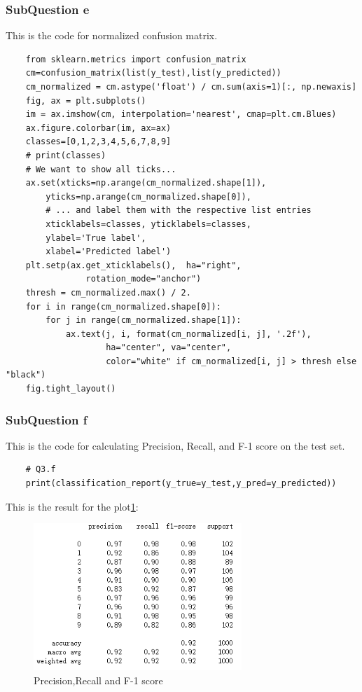 \documentclass[conference]{IEEEtran}
\begin{document}
\subsubsection{SubQuestion e}
This is the code for normalized confusion matrix.
\begin{lstlisting}
    from sklearn.metrics import confusion_matrix
    cm=confusion_matrix(list(y_test),list(y_predicted))
    cm_normalized = cm.astype('float') / cm.sum(axis=1)[:, np.newaxis]
    fig, ax = plt.subplots()
    im = ax.imshow(cm, interpolation='nearest', cmap=plt.cm.Blues)
    ax.figure.colorbar(im, ax=ax)
    classes=[0,1,2,3,4,5,6,7,8,9]
    # print(classes)
    # We want to show all ticks...
    ax.set(xticks=np.arange(cm_normalized.shape[1]),
        yticks=np.arange(cm_normalized.shape[0]),
        # ... and label them with the respective list entries
        xticklabels=classes, yticklabels=classes,
        ylabel='True label',
        xlabel='Predicted label')
    plt.setp(ax.get_xticklabels(),  ha="right",
                rotation_mode="anchor")
    thresh = cm_normalized.max() / 2.
    for i in range(cm_normalized.shape[0]):
        for j in range(cm_normalized.shape[1]):
            ax.text(j, i, format(cm_normalized[i, j], '.2f'),
                    ha="center", va="center",
                    color="white" if cm_normalized[i, j] > thresh else "black")
    fig.tight_layout()
\end{lstlisting}
\subsubsection{SubQuestion f}
This is the code for calculating Precision, Recall, and F-1 score on the test set.
\begin{lstlisting}
    # Q3.f
    print(classification_report(y_true=y_test,y_pred=y_predicted))
\end{lstlisting}
This is the result for the plot\ref{Fig.t1q3f}:
\begin{figure}[H] 
    \centering %
    \includegraphics[width=0.7\textwidth]{T1Q3f.png} %
    \caption{Precision,Recall and F-1 score} %
    \label{Fig.t1q3f} %
\end{figure}
\end{document}
